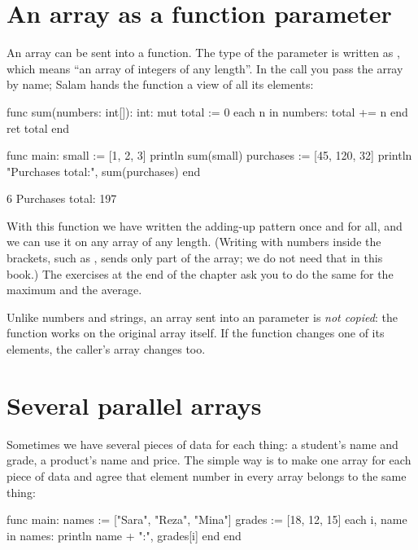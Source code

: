 \section{An array as a function parameter}

An array can be sent into a function. The type of the parameter is written
as , which means ``an array of integers of any length''. In the
call you pass the array by name; Salam hands the function a view of all its
elements:

\begin{salamcode}
func sum(numbers: int[]): int:
    mut total := 0
    each n in numbers:
        total += n
    end
    ret total
end

func main:
    small := [1, 2, 3]
    println sum(small)
    purchases := [45, 120, 32]
    println "Purchases total:", sum(purchases)
end
\end{salamcode}

\begin{salamout}
6
Purchases total: 197
\end{salamout}

With this function we have written the adding-up pattern once and for all,
and we can use it on any array of any length. (Writing \code{[:]} with
numbers inside the brackets, such as , sends only part
of the array; we do not need that in this book.) The exercises at the end of
the chapter ask you to do the same for the maximum and the average.

\begin{warn}
Unlike numbers and strings, an array sent into an  parameter
is \emph{not copied}: the function works on the original array itself. If
the function changes one of its elements, the caller's array changes too.
\end{warn}

\section{Several parallel arrays}

Sometimes we have several pieces of data for each thing: a student's name
and grade, a product's name and price. The simple way is to make one array
for each piece of data and agree that element number  in every
array belongs to the same thing:

\begin{salamcode}
func main:
    names := ["Sara", "Reza", "Mina"]
    grades := [18, 12, 15]
    each i, name in names:
        println name + ":", grades[i]
    end
end
\end{salamcode}

